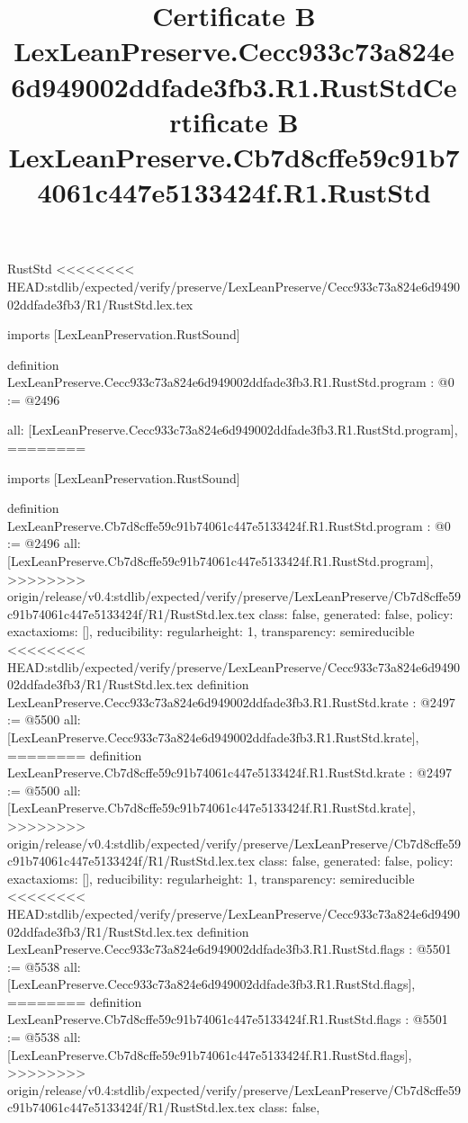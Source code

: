 \begin{lexlean}{RustStd}
<<<<<<<< HEAD:stdlib/expected/verify/preserve/LexLeanPreserve/Cecc933c73a824e6d949002ddfade3fb3/R1/RustStd.lex.tex
\title{Certificate B LexLeanPreserve.Cecc933c73a824e6d949002ddfade3fb3.R1.RustStd}
\begin{coremodule}
imports [LexLeanPreservation.RustSound]

definition LexLeanPreserve.Cecc933c73a824e6d949002ddfade3fb3.R1.RustStd.program : @0 := @2496 {
  all: [LexLeanPreserve.Cecc933c73a824e6d949002ddfade3fb3.R1.RustStd.program],
========
\title{Certificate B LexLeanPreserve.Cb7d8cffe59c91b74061c447e5133424f.R1.RustStd}
\begin{coremodule}
imports [LexLeanPreservation.RustSound]

definition LexLeanPreserve.Cb7d8cffe59c91b74061c447e5133424f.R1.RustStd.program : @0 := @2496 {
  all: [LexLeanPreserve.Cb7d8cffe59c91b74061c447e5133424f.R1.RustStd.program],
>>>>>>>> origin/release/v0.4:stdlib/expected/verify/preserve/LexLeanPreserve/Cb7d8cffe59c91b74061c447e5133424f/R1/RustStd.lex.tex
  class: false,
  generated: false,
  policy: exact{axioms: []},
  reducibility: regular{height: 1},
  transparency: semireducible
}
<<<<<<<< HEAD:stdlib/expected/verify/preserve/LexLeanPreserve/Cecc933c73a824e6d949002ddfade3fb3/R1/RustStd.lex.tex
definition LexLeanPreserve.Cecc933c73a824e6d949002ddfade3fb3.R1.RustStd.krate : @2497 := @5500 {
  all: [LexLeanPreserve.Cecc933c73a824e6d949002ddfade3fb3.R1.RustStd.krate],
========
definition LexLeanPreserve.Cb7d8cffe59c91b74061c447e5133424f.R1.RustStd.krate : @2497 := @5500 {
  all: [LexLeanPreserve.Cb7d8cffe59c91b74061c447e5133424f.R1.RustStd.krate],
>>>>>>>> origin/release/v0.4:stdlib/expected/verify/preserve/LexLeanPreserve/Cb7d8cffe59c91b74061c447e5133424f/R1/RustStd.lex.tex
  class: false,
  generated: false,
  policy: exact{axioms: []},
  reducibility: regular{height: 1},
  transparency: semireducible
}
<<<<<<<< HEAD:stdlib/expected/verify/preserve/LexLeanPreserve/Cecc933c73a824e6d949002ddfade3fb3/R1/RustStd.lex.tex
definition LexLeanPreserve.Cecc933c73a824e6d949002ddfade3fb3.R1.RustStd.flags : @5501 := @5538 {
  all: [LexLeanPreserve.Cecc933c73a824e6d949002ddfade3fb3.R1.RustStd.flags],
========
definition LexLeanPreserve.Cb7d8cffe59c91b74061c447e5133424f.R1.RustStd.flags : @5501 := @5538 {
  all: [LexLeanPreserve.Cb7d8cffe59c91b74061c447e5133424f.R1.RustStd.flags],
>>>>>>>> origin/release/v0.4:stdlib/expected/verify/preserve/LexLeanPreserve/Cb7d8cffe59c91b74061c447e5133424f/R1/RustStd.lex.tex
  class: false,
}}}
\end{coremodule}}
\end{coremodule}
\end{lexlean}
